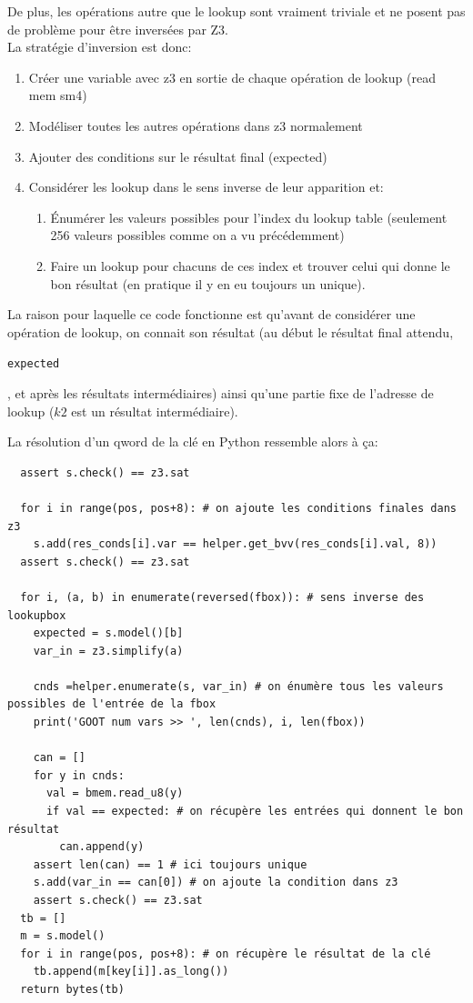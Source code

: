 \documentclass[14pt]{article}
\newcommand{\inlinebox}[2]{%
\colorbox{bg}{%
\parbox[b][0.6em]{\widthof{\texttt{#2}}}{\texttt{#2}}
}
}
\newcommand{\inlinepython}[1]{ \inlinebox{python}{#1} }
\theoremstyle{definition}
\begin{document}
De plus, les opérations autre que le lookup sont vraiment triviale et ne posent pas de problème pour être inversées par Z3. \\ 


La stratégie d'inversion est donc:
\begin{enumerate}
    \item Créer une variable avec z3 en sortie de chaque opération de lookup (read mem sm4)
    \item Modéliser toutes les autres opérations dans z3 normalement
    \item Ajouter des conditions sur le résultat final (expected)
    \item Considérer les lookup dans le sens inverse de leur apparition et:
      \begin{enumerate}
        \item Énumérer les valeurs possibles pour l'index du lookup table (seulement 256 valeurs possibles comme on a vu précédemment)
        \item Faire un lookup pour chacuns de ces index et trouver celui qui donne le bon résultat (en pratique il y en eu toujours un unique).
      \end{enumerate}
\end{enumerate}

\vspace*{\baselineskip}

La raison pour laquelle ce code fonctionne est qu'avant de considérer une opération de lookup, on connait son résultat (au début le résultat final attendu, \inlinepython{expected}, et après les résultats intermédiaires) ainsi qu'une partie fixe de l'adresse de lookup ($k2$ est un résultat intermédiaire).


La résolution d'un qword de la clé en Python ressemble alors à ça:
\begin{verbatim}
  assert s.check() == z3.sat

  for i in range(pos, pos+8): # on ajoute les conditions finales dans z3
    s.add(res_conds[i].var == helper.get_bvv(res_conds[i].val, 8))
  assert s.check() == z3.sat

  for i, (a, b) in enumerate(reversed(fbox)): # sens inverse des lookupbox
    expected = s.model()[b]
    var_in = z3.simplify(a)

    cnds =helper.enumerate(s, var_in) # on énumère tous les valeurs possibles de l'entrée de la fbox
    print('GOOT num vars >> ', len(cnds), i, len(fbox))

    can = []
    for y in cnds:
      val = bmem.read_u8(y)
      if val == expected: # on récupère les entrées qui donnent le bon résultat
        can.append(y)
    assert len(can) == 1 # ici toujours unique
    s.add(var_in == can[0]) # on ajoute la condition dans z3
    assert s.check() == z3.sat
  tb = []
  m = s.model()
  for i in range(pos, pos+8): # on récupère le résultat de la clé
    tb.append(m[key[i]].as_long())
  return bytes(tb)
\end{verbatim}
\end{document}
